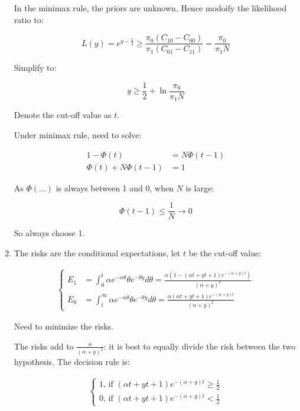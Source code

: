 \documentclass[11pt,letterpaper,titlepage]{article}
\begin{document}
\begin{enumerate}
    In the minimax rule, the priors are unknown. Hence modoify the likelihood ratio to:
    
    \begin{equation*}
        L(y) = e^{y - \frac{1}{2}} \geq \frac{\pi_0(C_{10} - C_{00})}{\pi_1(C_{01} - C_{11})} = \frac{\pi_0}{\pi_1 N}
    \end{equation*}
    
    Simplify to:
    
    \begin{equation*}
        y \geq \frac{1}{2} + \ln \frac{\pi_0}{\pi_1 N}
    \end{equation*}
    
    Denote the cut-off value as $t$.
    
    Under minimax rule, need to solve:
    
    \begin{equation*}
        \begin{aligned}
            1 - \Phi(t) &= N \Phi(t - 1) \\
            \Phi(t) + N \Phi(t - 1) &= 1
        \end{aligned}
    \end{equation*}
    
    As $\Phi(...)$ is always between 1 and 0, when $N$ is large:
    
    \begin{equation*}
        \Phi(t - 1) \leq \frac{1}{N} \rightarrow 0
    \end{equation*}
    
    So always choose 1.
    
    \item %
    
    The risks are the conditional expectations, let $t$ be the cut-off value:
    
    \begin{gather*}
        \begin{cases}
            E_1 &= \int_0^t \alpha e^{-\alpha \theta}\theta e^{-\theta y} d\theta  = \frac{\alpha(1 - (\alpha t + yt + 1)e^{-(\alpha + y)t})}{(\alpha + y)^2} \\
            E_0 &= \int_t^{\infty} \alpha e^{-\alpha \theta}\theta e^{-\theta y} d\theta = \frac{\alpha(\alpha t + yt + 1) e^{-(\alpha + y)t}}{(\alpha + y)^2}
        \end{cases}
    \end{gather*}
    
    Need to minimize the risks.
    
    The risks add to $\frac{\alpha}{(\alpha + y)^2}$: it is best to equally divide the risk between the two hypothesis. The decision rule is:
    
    \begin{gather*}
        \begin{cases}
            1 \text{, if } (\alpha t + yt + 1) e^{-(\alpha + y)t} \geq \frac{1}{2} \\
            0 \text{, if } (\alpha t + yt + 1) e^{-(\alpha + y)t} < \frac{1}{2}
        \end{cases}
    \end{gather*}
    
\end{enumerate}
\end{document}
